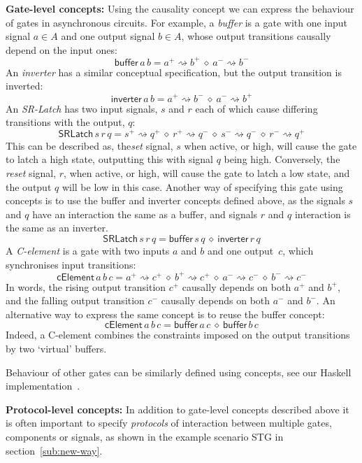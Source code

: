 \documentclass[british,compsoc]{IEEEtran}
\begin{document}
\textbf{Gate-level concepts:} Using the causality concept we can express
the behaviour of gates in asynchronous circuits. For example, a \emph{buffer}
is a gate with one input signal $a\in A$ and one output signal $b\in A$,
whose output transitions causally depend on the input ones:
\[
\mathsf{buffer}\, a\, b=a^{+}\rightsquigarrow b^{+}\ \diamond\ a^{-}\rightsquigarrow b^{-}
\]
An \emph{inverter} has a similar conceptual specification, but the
output transition is inverted:
\[
\mathsf{inverter}\,a \,b=a^{+}\rightsquigarrow b^{-}\ \diamond\ a^{-}\rightsquigarrow b^{+}
\]
An \emph{SR-Latch} has two input signals, $s$ and $r$ each of which cause differing transitions with the output, $q$:
\[
\mathsf{SRLatch}\,s \,r \,q=s^{+}\!\rightsquigarrow\! q^{+}\ \diamond\ r^{+}\!\rightsquigarrow\! q^{-}\ \diamond\ s^{-}\!\rightsquigarrow\! q^{-}\ \diamond\ r^{-}\!\rightsquigarrow\! q^{+}
\]
This can be described as, the\emph{set} signal, $s$ when active, or high, will cause the gate to latch a high state, outputting this with signal $q$ being high. Conversely, the \emph{reset} signal, $r$, when active, or high, will cause the gate to latch a low state, and the output $q$ will be low in this case.
Another way of specifying this gate using concepts is to use the buffer and inverter concepts defined above, as the signals $s$ and $q$ have an interaction the same as a buffer, and signals $r$ and $q$ interaction is the same as an inverter.
\[
\mathsf{SRLatch}\,s \,r \,q=\mathsf{buffer}\,s \,q \ \diamond\ \mathsf{inverter}\,r \,q
\]
A \emph{C-element} is a gate with two inputs $a$ and $b$ and one
output~$c$, which synchronises input transitions:
\[
\mathsf{cElement}\,a \,b \,c=a^{+}\!\rightsquigarrow\! c^{+}\ \diamond\ b^{+}\!\rightsquigarrow\! c^{+}\ \diamond\ a^{-}\!\rightsquigarrow\! c^{-}\ \diamond\ b^{-}\!\rightsquigarrow\! c^{-}
\]
In words, the rising output transition $c^{+}$ causally depends on
both $a^{+}$ and $b^{+}$, and the falling output transition $c^{-}$
causally depends on both $a^{-}$ and $b^{-}$. An alternative way
to express the same concept is to reuse the buffer concept:
\[
\mathsf{cElement}\,a \,b \,c=\mathsf{buffer}\,a \,c \ \diamond\ \mathsf{buffer}\,b \,c
\]
Indeed, a C-element combines the constraints imposed on the output
transitions by two `virtual' buffers.

Behaviour of other gates can be similarly defined using concepts,
see our Haskell implementation~\cite{2016_concepts_github}.

\textbf{Protocol-level concepts:} In addition to gate-level concepts
described above it is often important to specify \emph{protocols}
of interaction between multiple gates, components or signals, as shown in the example scenario STG in section~\ref{sub:new-way}.
\end{document}
